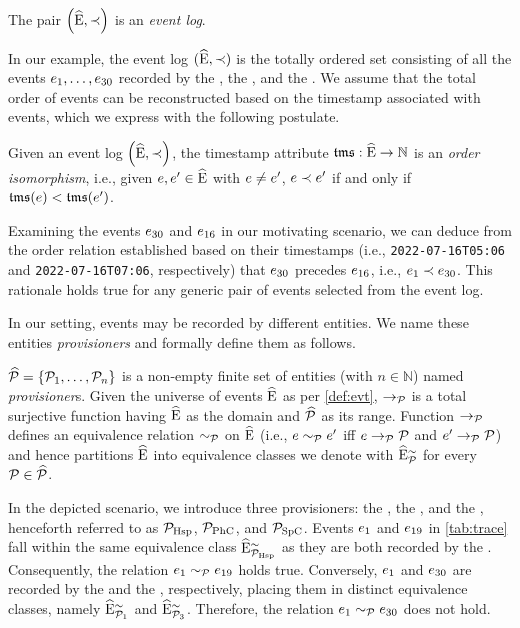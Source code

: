 \begin{newj}
\begin{definition}
	The pair $\left( \widehat{\mathrm{E}}, \prec \right)$ is an \emph{event log}.
\end{definition}
In our example, %
the event log $(\widehat{\mathrm{E}},\prec)$ is the totally ordered set consisting of all the events $e_1, \ldots, e_{30}$ recorded by the , the , and the . We assume that the total order of events can be reconstructed based on the timestamp associated with events, which we express with the following postulate.
%
\begin{assumption}\label{asm:order:timestamp}
	Given an event log $\left( \widehat{\mathrm{E}}, \prec \right)$, the timestamp attribute $\mathfrak{tms}: \widehat{\mathrm{E}} \to \mathbb{N}$ is an \textit{order isomorphism}, i.e., given $e, e' \in \widehat{\mathrm{E}}$ with $e \neq e'$, $e \prec e'$ if and only if $\mathfrak{tms}(e) < \mathfrak{tms}(e')$.
\end{assumption}
%
Examining the events $e_{30}$ and $e_{16}$ in our motivating scenario, we can deduce from the order relation established based on their timestamps (i.e., \texttt{2022-07-16T05:06} and \texttt{2022-07-16T07:06}, respectively) that $e_{30}$ precedes $e_{16}$, i.e., ${e_1}\prec{\ensuremath{e}_{30}}$. This rationale holds true for any generic pair of events selected from the event log.
%

In our setting, events may be recorded by different entities. We name these entities \emph{provisioners} and formally define them as follows.
\begin{definition}[Provisioner]\label{def:provisioner}
	$\widehat{\mathcal{P}} = \{ \mathcal{P}_1, \ldots, \mathcal{P}_n \}$ is a non-empty finite set of entities (with $n \in \mathbb{N}$) named \emph{provisioner}s. 
    Given the universe of events $\widehat{\mathrm{E}}$ as per \cref{def:evt}, $\to_{\mathcal{P}}$ is a total surjective function having $\widehat{\mathrm{E}}$ as the domain and $\widehat{\mathcal{P}}$ as its range. Function $\to_{\mathcal{P}}$ defines an equivalence relation $\sim_{\mathcal{P}}$ on $\widehat{\mathrm{E}}$ (i.e., $e \sim_{\mathcal{P}} e'$ iff $e \to_{\mathcal{P}} \mathcal{P}$ and $e' \to_{\mathcal{P}} \mathcal{P}$) and hence partitions $\widehat{\mathrm{E}}$ into equivalence classes we denote with $\widehat{\mathrm{E}}^{\sim}_{\mathcal{P}}$ for every $\mathcal{P} \in \widehat{\mathcal{P}}$.
\end{definition}
In the depicted scenario, we introduce three provisioners: the , the , and the , henceforth referred to as $\mathcal{P}_\textrm{Hsp}$, $\mathcal{P}_\textrm{PhC}$, and $\mathcal{P}_\textrm{SpC}$. Events $e_{1}$ and $e_{19}$ in \cref{tab:trace} fall within the same equivalence class $\widehat{\mathrm{E}}^{\sim}_{\mathcal{P}_\textrm{Hsp}}$ as they are both recorded by the . Consequently, the relation $e_1 \sim_{\mathcal{P}} e_{19}$ holds true. Conversely, $e_{1}$ and $e_{30}$ are recorded by the  and the , respectively, placing them in distinct equivalence classes, namely $\widehat{\mathrm{E}}^{\sim}_{\mathcal{P}_1}$ and $\widehat{\mathrm{E}}^{\sim}_{\mathcal{P}_3}$. Therefore, the relation $e_1 \sim_{\mathcal{P}} e_{30}$ does not hold. 


\end{newj}
